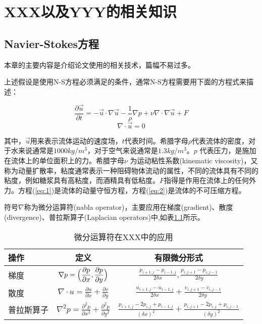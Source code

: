 \chapter{XXX以及YYY的相关知识}
\section{Navier-Stokes方程}

本章的主要内容是介绍论文使用的相关技术，篇幅不易过多。

上述假设是使用N-S方程必须满足的条件，通常N-S方程需要用下面的方程式来描述\cite{02}：

\begin{equation} \label{eq:1}
\frac{\partial \vec u}{\partial t} = - \vec u \cdot \nabla \vec u - \frac{1}{\rho}\nabla p +\nu \nabla \cdot \nabla \vec u  + F
\end{equation}
\begin{equation} \label{eq:2}
\nabla \cdot \vec u = 0
\end{equation}

其中，$\vec{u}$用来表示流体运动的速度场，${t}$代表时间。希腊字母$\rho$代表流体的密度，对于水来说通常是$1000kg/m^{3}$，对于空气来说通常是$1.3kg/m^{3}$。$p$ 代表压力，是施加在流体上的单位面积上的力。希腊字母$\nu$ 为运动粘性系数(kinematic viscosity)，又称为动量扩散率，粘度通常表示一种阻碍物体流动的属性，不同的流体具有不同的粘度，例如糖浆具有高粘度，而酒精具有低粘度。$F$指得是作用在流体上的任何外力\cite{03}。方程(\ref{eq:1})是流体的动量守恒方程，方程(\ref{eq:2})是流体的不可压缩方程。

符号$\nabla$称为微分运算符(nabla operator)，主要应用在梯度(gradient)、散度(divergence)、普拉斯算子(Laplacian operators)中,如表\ref{tab:1}所示。

\renewcommand\arraystretch{2.5}
\begin{table}[htbp]
\centering
\caption{微分运算符在XXX中的应用} \label{tab:1}
\begin{tabular}{|l|c|c|}

    \hline
    操作 & 定义 & 有限微分形式 \\
    \hline
    梯度 & $ \displaystyle \nabla p = \Bigl( \frac{\partial p}{\partial x} , \frac{\partial p}{\partial y} \Bigr)$ & $\displaystyle \frac{p_{i+1,j} - p_{i-1,j}}{2\delta x} , \frac{p_{i,j+1} - p_{i,j-1}}{2\delta y}$ \\
    \hline
    散度 & $ \displaystyle \nabla \cdot u  =  \frac{\partial u}{\partial x} + \frac{\partial v}{\partial y} $ & $ \displaystyle \frac{u_{i+1,j} - u_{i-1,j}}{2\delta x} + \frac{v_{i,j+1} - v_{i,j-1}}{2\delta y}$ \\
    \hline
    普拉斯算子 & $ \displaystyle \nabla^2 p =  \frac{\partial^2 p}{\partial x^2} + \frac{\partial^2 p}{\partial y^2}$ & $ \displaystyle \frac{p_{i+1,j}  - 2p_{i,j} + p_{i-1,j}}{(\delta x)^2} + \frac{p_{i,j+1}  - 2p_{i,j} + p_{i,j-1}}{(\delta y)^2}$ \\
    \hline
\end{tabular}
\end{table}

